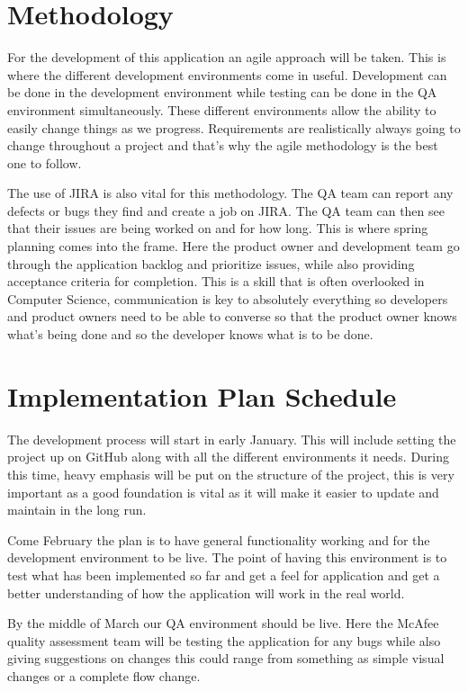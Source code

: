 \section{Methodology}
For the development of this application an agile approach will be taken. This is where the different development environments come in useful. Development can be done in the development environment while testing can be done in the QA environment simultaneously. These different environments allow the ability to easily change things as we progress. Requirements are realistically always going to change throughout a project and that's why the agile methodology is the best one to follow. 

The use of JIRA is also vital for this methodology. The QA team can report any defects or bugs they find and create a job on JIRA. The QA team can then see that their issues are being worked on and for how long. This is where spring planning comes into the frame. Here the product owner and development team go through the application backlog and prioritize issues, while also providing acceptance criteria for completion. This is a skill that is often overlooked in Computer Science, communication is key to absolutely everything so developers and product owners need to be able to converse so that the product owner knows what's being done and so the developer knows what is to be done. 


\section{Implementation Plan Schedule}
The development process will start in early January. This will include setting the project up on GitHub along with all the different environments it needs. During this time, heavy emphasis will be put on the structure of the project, this is very important as a good foundation is vital as it will make it easier to update and maintain in the long run. 

Come February the plan is to have general functionality working and for the development environment to be live. The point of having this environment is to test what has been implemented so far and get a feel for application and get a better understanding of how the application will work in the real world. 

By the middle of March our QA environment should be live. Here the McAfee quality assessment team will be testing the application for any bugs while also giving suggestions on changes this could range from something as simple visual changes or a complete flow change. 

